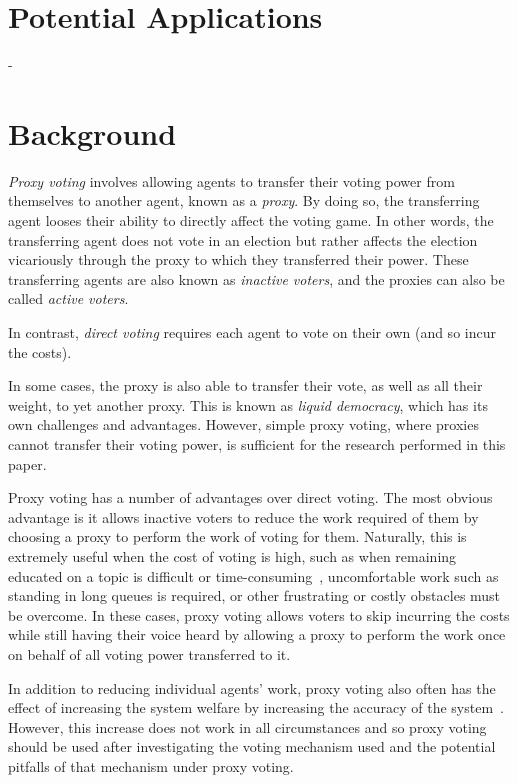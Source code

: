 \section{Potential Applications}\label{sec:potential-applications}
- %


\section{Background}\label{sec:background}
\textit{Proxy voting} involves allowing agents to transfer their voting power
from themselves to another agent, known as a \textit{proxy}\cite[para.~1.4]
{Cohensius2017}.
By doing so, the transferring agent looses their ability to directly affect the
voting game.
In other words, the transferring agent does not vote in an election but rather
affects the election vicariously through the proxy to which they transferred
their power.
These transferring agents are also known as \textit{inactive voters}, and the
proxies can also be called \textit{active voters}.

In contrast, \textit{direct voting} requires each agent to vote on their own
(and so incur the costs).

In some cases, the proxy is also able to transfer their vote, as well as all
their weight, to yet another proxy.
This is known as \textit{liquid democracy}, which has its own challenges and
advantages.
However, simple proxy voting, where proxies cannot transfer their voting power,
is sufficient for the research performed in this paper.

Proxy voting has a number of advantages over direct voting.
The most obvious advantage is it allows inactive voters to reduce the work
required of them by choosing a proxy to perform the work of voting for them.
Naturally, this is extremely useful when the cost of voting is high, such as
when remaining educated on a topic is difficult or
time-consuming~\cite[para.~1.1]{Mueller1972}, uncomfortable work such as
standing in long queues is required, or other frustrating or costly obstacles
must be overcome.
In these cases, proxy voting allows voters to skip incurring the costs while
still having their voice heard by allowing a proxy to perform the work once on
behalf of all voting power transferred to it.

In addition to reducing individual agents' work, proxy voting also often has
the effect of increasing the system welfare by increasing the accuracy of the
system~\cite[sec.~1.1]{Cohensius2017}.
However, this increase does not work in all circumstances and so proxy voting
should be used after investigating the voting mechanism used and the potential
pitfalls of that mechanism under proxy voting.

